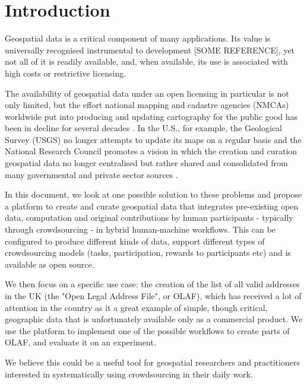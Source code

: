 \section{Introduction}

Geospatial data is a critical component of many applications. Its value is universally recognised instrumental to development [SOME REFERENCE], yet not all of it is readily available, and, when available, its use is associated with high costs or restrictive licensing. 

The availability of geospatial data under an open licensing in particular is not only limited, but the effort national mapping and cadastre agencies (NMCAs) worldwide put into producing and updating cartography for the public good has been in decline for several decades \cite{ESTES:1994vz}. In the U.S., for example, the Geological Survey (USGS) no longer attempts to update its maps on a regular basis and the National Research Council promotes a vision in which the creation and curation geospatial data no longer centralised but rather shared and consolidated from many governmental and private sector sources \cite{Committee:1993vp}.

In this document, we look at one possible solution to these problems and propose a platform to create and curate geospatial data that integrates pre-existing open data, computation and original contributions by human participants - typically through crowdsourcing - in hybrid human-machine workflows. This can be configured to produce different kinds of data, support different types of crowdsourcing models (tasks, participation, rewards to participants etc) and is available as open source.

We then focus on a specific use case: the creation of the list of all valid addresses in the UK (the "Open Legal Address File", or OLAF), which has received a lot of attention in the country as it a great example of simple, though critical, geographic data that is unfortunately available only as a commercial product. We use the platform to implement one of the possible workflows to create parts of OLAF, and evaluate it on an experiment. 

We believe this could be a useful tool for geospatial researchers and practitioners interested in systematically using crowdsourcing in their daily work.
